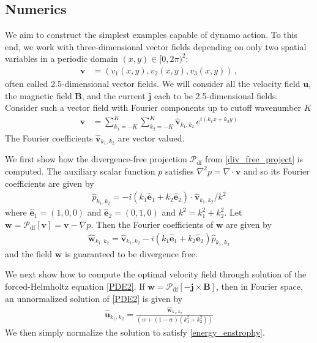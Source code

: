 \documentclass[onecolumn,showpacs,preprintnumbers,amsmath,amssymb]{revtex4-2}
\newcommand{\bvec}[1]{{\mathbf{#1}}}
\newcommand{\grad}{\nabla}
\newcommand{\uu}{\bvec{u}}
\newcommand{\vv}{\bvec{v}}
\newcommand{\Bvec}{\bvec{B}}
\newcommand{\jvec}{\bvec{j}}
\newcommand{\weight}{w}
\newcommand{\ex}{\hat{\bvec{e}}_1}
\newcommand{\ey}{\hat{\bvec{e}}_2}
\newcommand{\proj}{ \mathcal{P}_{\text{df}} }
\newcommand{\eikx}{e^{ i \left( k_1 x + k_2 y \right) }}
\begin{document}
\subsection{Numerics}

We aim to construct the simplest examples capable of dynamo action.
To this end, we work with three-dimensional vector fields depending on only two spatial variables in a periodic domain $(x,y) \in [0, 2\pi)^2$:
\begin{align}
\vv &= (v_1(x,y), v_2(x,y), v_3(x,y)) \, ,
\end{align}
often called 2.5-dimensional vector fields. We will consider all the velocity field $\uu$, the magnetic field $\Bvec$, and the current $\jvec$ each to be 2.5-dimensional fields.
Consider such a vector field with Fourier components up to cutoff wavenumber $K$
\begin{align}
\label{vec_Fourier}
\vv &= \sum_{k_1 = -K}^{K} \sum_{k_2 = -K}^{K} \hat{\vv}_{k_1, k_2} \, \eikx
\end{align}
The Fourier coefficients $\hat{\vv}_{k_1, k_2}$ are vector valued.

We first show how the divergence-free projection $\proj$ from \cref{div_free_project} is computed. The auxiliary scalar function $p$ satisfies $\grad^2 p = \grad \cdot \vv$ and so its Fourier coefficients are given by
\begin{align}
\label{}
\hat{p}_{k_1, k_2} = -i  \left( k_1 \ex + k_2 \ey \right) \cdot \hat{\vv}_{k_1,k_2} / k^2
\end{align}
where $\ex = (1,0,0)$ and $\ey = (0,1,0)$ and $k^2 = k_1^2 + k_2^2$. Let $\bvec{w} = \proj[ \vv ] = \vv - \grad p$. Then the Fourier coefficients of $\bvec{w}$ are given by
\begin{align}
\label{}
\hat{\bvec{w}}_{k_1, k_2} = \hat{\vv}_{k_1,k_2} - i \left( k_1 \ex + k_2 \ey \right) \hat{p}_{k_1,k_2}
\end{align}
and the field $\bvec{w}$ is guaranteed to be divergence free.

We next show how to compute the optimal velocity field through solution of the forced-Helmholtz equation \cref{PDE2}. If $\bvec{w} = \proj \left[ - \jvec \times \Bvec \right]$, then in Fourier space, an unnormalized solution of \cref{PDE2} is given by
\begin{align}
\label{PDE2}
\hat{\uu}_{k_1,k_2} = \frac{\hat{\bvec{w}}_{k_1,k_2} }{ \left( \weight + (1-\weight) (k_1^2 + k_2^2) \right)  }
\end{align}
We then simply normalize the solution to satisfy \cref{energy_enstrophy}.
\end{document}
